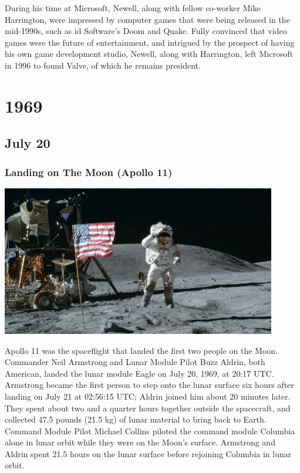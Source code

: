 \documentclass[11pt]{report}
\begin{document}
During his time at Microsoft, Newell, along with fellow co-worker Mike Harrington, were impressed by computer games that were being released in the mid-1990s, such as id Software's Doom and Quake. Fully convinced that video games were the future of entertainment, and intrigued by the prospect of having his own game development studio, Newell, along with Harrington, left Microsoft in 1996 to found Valve, of which he remains president.

\chapter{1969}
\section{July 20}
\subsection{Landing on The Moon (Apollo 11)}
\vspace{2mm}\begin{center}\includegraphics[width=12cm]{./img/apollo11.jpg}\end{center}
Apollo 11 was the spaceflight that landed the first two people on the Moon. Commander Neil Armstrong and Lunar Module Pilot Buzz Aldrin, both American, landed the lunar module Eagle on July 20, 1969, at 20:17 UTC. Armstrong became the first person to step onto the lunar surface six hours after landing on July 21 at 02:56:15 UTC; Aldrin joined him about 20 minutes later. They spent about two and a quarter hours together outside the spacecraft, and collected 47.5 pounds (21.5 kg) of lunar material to bring back to Earth. Command Module Pilot Michael Collins piloted the command module Columbia alone in lunar orbit while they were on the Moon's surface. Armstrong and Aldrin spent 21.5 hours on the lunar surface before rejoining Columbia in lunar orbit.
\end{document}
